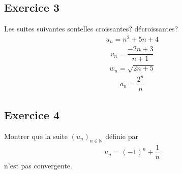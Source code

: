 \documentclass[letterpaper,10pt,french]{jupyterBook}
\begin{document}
\subsection{Exercice 3}
\label{\detokenize{exo2:exercice-3}}
\sphinxAtStartPar
Les suites suivantes sont\sphinxhyphen{}elles croissantes? décroissantes?
\begin{equation*}
\begin{split}
u_n = n^2 + 5n +4
\end{split}
\end{equation*}\begin{equation*}
\begin{split}
v_n =\dfrac{-2n+3}{n+1}
\end{split}
\end{equation*}\begin{equation*}
\begin{split}
w_n = \sqrt{2n+5}
\end{split}
\end{equation*}\begin{equation*}
\begin{split}
a_n = \dfrac{2^n}{n}
\end{split}
\end{equation*}

\subsection{Exercice 4}
\label{\detokenize{exo2:exercice-4}}
\sphinxAtStartPar
Montrer que la suite \((u_n)_{n\in\mathbb{N}}\) définie par
\begin{equation*}
\begin{split}
u_n = (-1)^n + \dfrac{1}{n}
\end{split}
\end{equation*}
\sphinxAtStartPar
n’est pas convergente.
\end{document}
